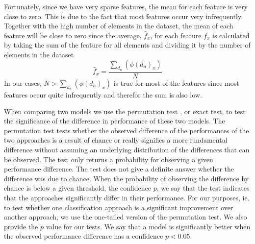 
Fortunately, since we have very sparse features, the mean for each feature is very close to zero.
This is due to the fact that most features occur very infrequently. Together with the high number of elements in the dataset, the mean of each feature will be close to zero since the average, $\hat{f}_x$, for each feature $f_x$ is calculated by taking the sum of the feature for all elements and dividing it by the number of elements in the dataset
\begin{equation*}
\hat{f}_x = \frac{\sum_{d_n} (\phi(d_n)_x)}{N}
\end{equation*}
In our cases, $N > \sum_{d_n} (\phi(d_n)_x)$ is true for most of the features since most features occur quite infrequently and therefor the sum is also low.

When comparing two models we use the permutation test \cite{Fisher1925}, or exact test, to test the significance of the difference in performance of these two models.
The permutation test tests whether the observed difference of the performances of the two approaches is a result of chance or really signifies a more fundamental difference without assuming an underlying distribution of the differences that can be observed.
The test only returns a probability for observing a given performance difference. The test does not give a definite answer whether the difference was due to chance.
When the probability of observing the difference by chance is below a given threshold, the confidence $p$, we say that the test indicates that the approaches significantly differ in their performance.
For our purposes, ie. to test whether one classification approach is a significant improvement over another approach, we use the one-tailed version \cite{Kock2015} of the permutation test.
We also provide the $p$ value for our tests.
We say that a model is significantly better when the observed performance difference has a confidence $p < 0.05$.

